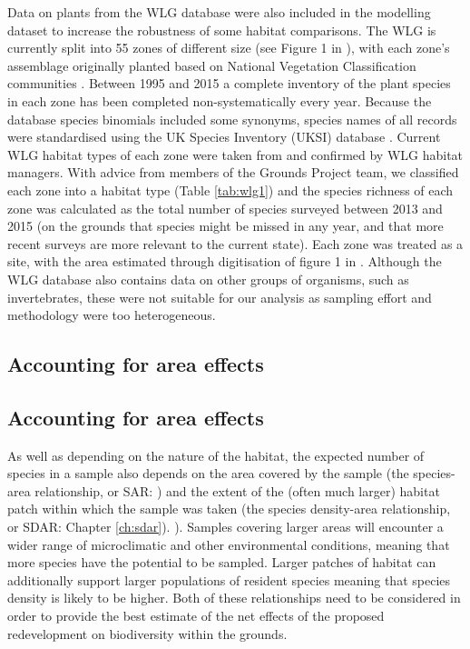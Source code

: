 Data on plants from the WLG database were also included in the modelling dataset to increase the robustness of some habitat comparisons. The WLG is currently split into 55 zones of different size (see Figure 1 in \citealt{Leigh:2003ln}), with each zone's assemblage originally planted based on National Vegetation Classification communities \citep{Honey:1999ln,Rodwell:1998nvc}. Between 1995 and 2015 a complete inventory of the plant species in each zone has been completed non-systematically every year. Because the database species binomials included some synonyms, species names of all records were standardised using the UK Species Inventory (UKSI) database \citep{Raper:2014wg}. Current WLG habitat types of each zone were taken from \citep{Leigh:2003ln} and confirmed by WLG habitat managers. With advice from members of the Grounds Project team, we classified each zone into a habitat type (Table \ref{tab:wlg1}) and the species richness of each zone was calculated as the total number of species surveyed between 2013 and 2015 (on the grounds that species might be missed in any year, and that more recent surveys are more relevant to the current state). Each zone was treated as a site, with the area estimated through digitisation of figure 1 in \cite{Leigh:2003ln}. Although the WLG database also contains data on other groups of organisms, such as invertebrates, these were not suitable for our analysis as sampling effort and methodology were too heterogeneous.

\ifappendixStyle %
\subsection{Accounting for area effects}%
\else
\subsection*{Accounting for area effects}
\fi
As well as depending on the nature of the habitat, the expected number of species in a sample also depends on the area covered by the sample (the species-area relationship, or SAR: \citealt{rosenzweig:1995species}) and the extent of the (often much larger) habitat patch within which the sample was taken (the species density-area relationship, or SDAR: 
\ifappendixStyle %
Chapter \ref{ch:sdar}).%
\else
\citealt{Phillips:2015sdar}).
\fi
Samples covering larger areas will encounter a wider range of microclimatic and other environmental conditions, meaning that more species have the potential to be sampled. Larger patches of habitat can additionally support larger populations of resident species meaning that species density is likely to be higher. Both of these relationships need to be considered in order to provide the best estimate of the net effects of the proposed redevelopment on biodiversity within the grounds.

